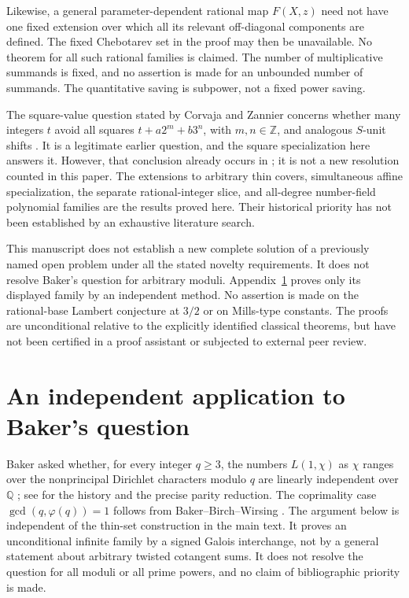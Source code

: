 \documentclass[11pt,a4paper]{article}
\theoremstyle{definition}
\theoremstyle{remark}
\newcommand{\Z}{\mathbb Z}
\begin{document}
Likewise, a general parameter-dependent rational map $F(X,z)$ need not
have one fixed extension over which all its relevant off-diagonal
components are defined. The fixed Chebotarev set in the proof may then
be unavailable. No theorem for all such rational families is claimed.
The number of multiplicative summands is fixed, and no assertion is
made for an unbounded number of summands. The quantitative saving is
subpower, not a fixed power saving.

The square-value question stated by Corvaja and Zannier concerns whether
many integers $t$ avoid all squares $t+a2^m+b3^n$, with $m,n\in\Z$,
and analogous $S$-unit shifts \cite[after Example~1.3]{CZ}. It is a
legitimate earlier question, and the square specialization here answers
it. However, that conclusion already occurs in \cite{Corpus60}; it is
not a new resolution counted in this paper. The extensions to arbitrary
thin covers, simultaneous affine specialization, the separate
rational-integer slice, and all-degree number-field polynomial families
are the results proved here. Their historical priority has not been
established by an exhaustive literature search.

This manuscript does not establish a new complete solution of a previously
named open problem under all the stated novelty requirements. It does not resolve Baker's question for arbitrary moduli. Appendix~\ref{bkapp:section}
proves only its displayed family by an independent method. No assertion
is made on the rational-base Lambert conjecture at $3/2$ or on Mills-type
constants. The proofs are unconditional relative to the explicitly
identified classical theorems, but have not been certified in a proof
assistant or subjected to external peer review.

\clearpage
\appendix
\section{An independent application to Baker's question}
\label{bkapp:section}

Baker asked whether, for every integer $q\geq3$, the numbers
$L(1,\chi)$ as $\chi$ ranges over the nonprincipal Dirichlet characters
modulo $q$ are linearly independent over $\mathbb Q$
\cite[p.~48]{BK_Baker1975}; see \cite{BK_KR2022} for the history and
the precise parity reduction.  The coprimality case
$\gcd(q,\varphi(q))=1$ follows from Baker--Birch--Wirsing
\cite{BK_BBW1973}.
The argument below is independent of the thin-set construction in the main
text.  It proves an unconditional infinite family by a signed Galois
interchange, not by a general statement about arbitrary twisted cotangent
sums.  It does not resolve the question for all moduli or all prime powers,
and no claim of bibliographic priority is made.
\end{document}
